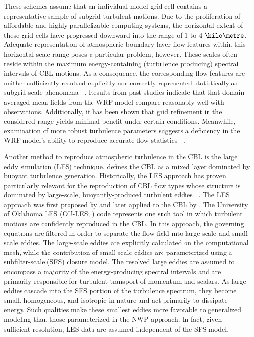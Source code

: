 These schemes assume that an individual model grid cell contains a representative sample of subgrid turbulent motions. Due to the proliferation of affordable and highly parallelizable computing systems, the horizontal extent of these grid cells have progressed downward into the range of $1$ to $4 \mbox{ }\kilo\metre$. Adequate representation of atmospheric boundary layer flow features within this horizontal scale range poses a particular problem, however. These scales often reside within the maximum energy-containing (turbulence producing) spectral intervals of CBL motions. As a consequence, the corresponding flow features are neither sufficiently resolved explicitly nor correctly represented statistically as subgrid-scale phenomena ~\citep{Wyngaard2004}. Results from past studies indicate that that domain-averaged mean fields from the WRF model compare reasonably well with observations. Additionally, it has been shown that grid refinement in the considered range yields minimal benefit under certain conditions. Meanwhile, examination of more robust turbulence parameters suggests a deficiency in the WRF model's ability to reproduce accurate flow statistics ~\citep{Gibbs2008, Gibbs2011}.

Another method to reproduce atmospheric turbulence in the CBL is the large eddy simulation (LES) technique.  \citet{Stull} defines the CBL as a mixed layer dominated by buoyant turbulence generation. Historically, the LES approach has proven particularly relevant for the reproduction of CBL flow types whose structure is dominated by large-scale, buoyantly-produced turbulent eddies ~\citep{Deardorff, Moeng84, Mason89, Schmidt89, Feddy04b}. The LES approach was first proposed by  \citet{Smag} and later applied to the CBL by  \citet{Deardorff1970}. The University of Oklahoma LES (OU-LES;  \citealt{Feddy04a, Feddy04b}) code represents one such tool in which turbulent motions are confidently reproduced in the CBL. In this approach, the governing equations are filtered in order to separate the flow field into large-scale and small-scale eddies. The large-scale eddies are explicitly calculated on the computational mesh, while the contribution of small-scale eddies are parameterized using a subfilter-scale (SFS) closure model. The resolved large eddies are assumed to encompass a majority of the energy-producing spectral intervals and are primarily responsible for turbulent transport of momentum and scalars. As large eddies cascade into the SFS portion of the turbulence spectrum, they become small, homogeneous, and isotropic in nature and act primarily to dissipate energy. Such qualities make these smallest eddies more favorable to generalized modeling than those parameterized in the NWP approach. In fact, given sufficient resolution, LES data are assumed independent of the SFS model. 

